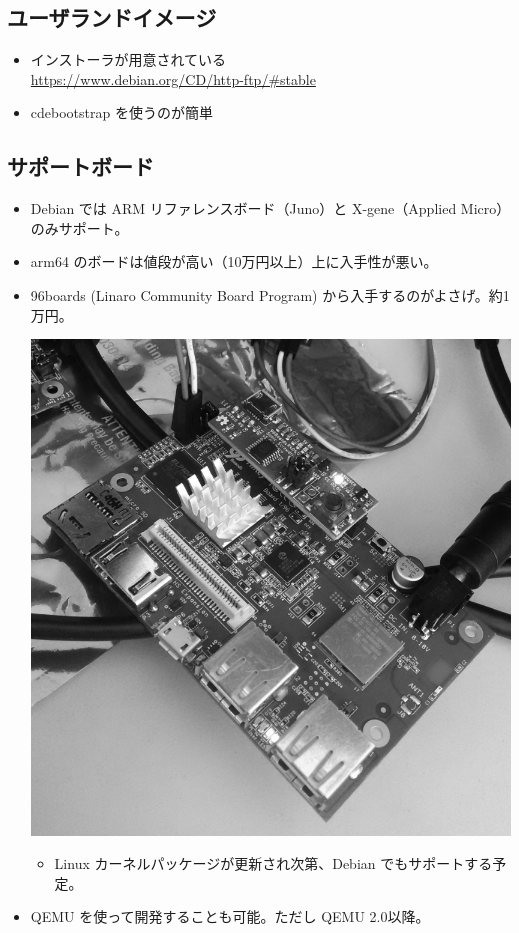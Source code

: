 \documentclass[mingoth,a4paper]{jsarticle}
\begin{document}
  \subsection{ユーザランドイメージ}
  \begin{itemize}
  \item インストーラが用意されている \\
	  \url{https://www.debian.org/CD/http-ftp/#stable}
  \item cdebootstrap を使うのが簡単

  \end{itemize}




  \subsection{サポートボード}
  \begin{itemize}
  \item Debian では ARM リファレンスボード（Juno）と X-gene（Applied Micro）のみサポート。
  \item arm64 のボードは値段が高い（10万円以上）上に入手性が悪い。
  
  \end{itemize}

  \begin{itemize}
    \item 96boards (Linaro Community Board Program) から入手するのがよさげ。約1万円。
    \begin{center}
    \includegraphics[width=0.3\hsize]{image201511/hikey_mono.png}
    \end{center}
    \begin{itemize}
    \item Linux カーネルパッケージが更新され次第、Debian でもサポートする予定。
    \end{itemize}
  \item QEMU を使って開発することも可能。ただし QEMU 2.0以降。
  \end{itemize}
\end{document}
